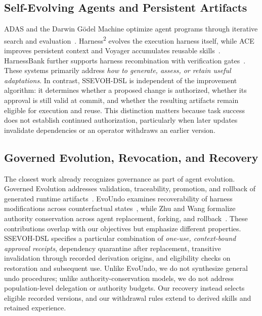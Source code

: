 \documentclass[letterpaper,journal]{IEEEtran}
\newcommand{\tool}{SSEVOH-DSL}
\newcommand{\harness}{Harness\textsuperscript{2}}
\begin{document}
\subsection{Self-Evolving Agents and Persistent Artifacts}
ADAS and the Darwin G\"odel Machine optimize agent programs through iterative search and evaluation~\cite{adas,dgm}. \harness{} evolves the execution harness itself, while ACE improves persistent context and Voyager accumulates reusable skills~\cite{harness2,ace,voyager}. HarnessBank further supports harness recombination with verification gates~\cite{harnessbank}. These systems primarily address \emph{how to generate, assess, or retain useful adaptations}. In contrast, \tool{} is independent of the improvement algorithm: it determines whether a proposed change is authorized, whether its approval is still valid at commit, and whether the resulting artifacts remain eligible for execution and reuse. This distinction matters because task success does not establish continued authorization, particularly when later updates invalidate dependencies or an operator withdraws an earlier version.

\subsection{Governed Evolution, Revocation, and Recovery}
The closest work already recognizes governance as part of agent evolution. Governed Evolution addresses validation, traceability, promotion, and rollback of generated runtime artifacts~\cite{governedevolution}. EvoUndo examines recoverability of harness modifications across counterfactual states~\cite{evoundo}, while Zhu and Wang formalize authority conservation across agent replacement, forking, and rollback~\cite{succession}. These contributions overlap with our objectives but emphasize different properties. \tool{} specifies a particular combination of \emph{one-use, context-bound approval receipts}, dependency quarantine after replacement, transitive invalidation through recorded derivation origins, and eligibility checks on restoration and subsequent use. Unlike EvoUndo, we do not synthesize general undo procedures; unlike authority-conservation models, we do not address population-level delegation or authority budgets. Our recovery instead selects eligible recorded versions, and our withdrawal rules extend to derived skills and retained experience.
\end{document}

